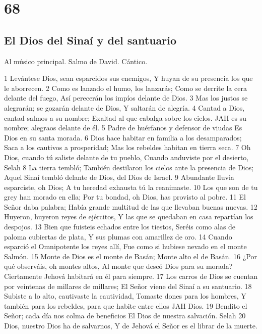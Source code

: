 \chapter{68}

\section*{El Dios del Sinaí y del santuario}

Al músico principal. Salmo de David. Cántico.

1 Levántese Dios, sean esparcidos sus enemigos,
Y huyan de su presencia los que le aborrecen.
2 Como es lanzado el humo, los lanzarás;
Como se derrite la cera delante del fuego,
Así perecerán los impíos delante de Dios.
3 Mas los justos se alegrarán; se gozarán delante de Dios,
Y saltarán de alegría.
4 Cantad a Dios, cantad salmos a su nombre;
Exaltad al que cabalga sobre los cielos.
JAH es su nombre; alegraos delante de él.
5 Padre de huérfanos y defensor de viudas
Es Dios en su santa morada.
6 Dios hace habitar en familia a los desamparados;
Saca a los cautivos a prosperidad;
Mas los rebeldes habitan en tierra seca.
7 Oh Dios, cuando tú saliste delante de tu pueblo,
Cuando anduviste por el desierto, Selah
8 La tierra tembló;
También destilaron los cielos ante la presencia de Dios;
Aquel Sinaí tembló delante de Dios, del Dios de Israel.
9 Abundante lluvia esparciste, oh Dios;
A tu heredad exhausta tú la reanimaste.
10 Los que son de tu grey han morado en ella;
Por tu bondad, oh Dios, has provisto al pobre.
11 El Señor daba palabra;
Había grande multitud de las que llevaban buenas nuevas.
12 Huyeron, huyeron reyes de ejércitos,
Y las que se quedaban en casa repartían los despojos.
13 Bien que fuisteis echados entre los tiestos,
Seréis como alas de paloma cubiertas de plata,
Y sus plumas con amarillez de oro.
14 Cuando esparció el Omnipotente los reyes allí,
Fue como si hubiese nevado en el monte Salmón.
15 Monte de Dios es el monte de Basán;
Monte alto el de Basán.
16 ¿Por qué observáis, oh montes altos,
Al monte que deseó Dios para su morada?
Ciertamente Jehová habitará en él para siempre.
17 Los carros de Dios se cuentan por veintenas de millares de millares;
El Señor viene del Sinaí a su santuario.
18 Subiste a lo alto, cautivaste la cautividad,
Tomaste dones para los hombres,
Y también para los rebeldes, para que habite entre ellos JAH Dios.
19 Bendito el Señor; cada día nos colma de beneficios
El Dios de nuestra salvación. Selah
20 Dios, nuestro Dios ha de salvarnos,
Y de Jehová el Señor es el librar de la muerte.
